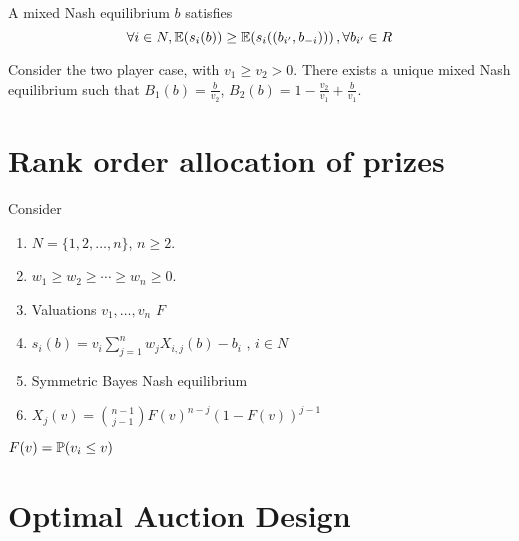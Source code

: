 A mixed Nash equilibrium $b$ satisfies
\begin{equation}
  \label{eq:3}
  \forall i \in N, \E{s_{i}(b)} \geq \E{s_{i}((b_{i'}, b_{-i}))}, \forall b_{i'} \in R
\end{equation}

Consider the two player case, with $v_{1} \geq v_{2} > 0$.  There
exists a unique mixed Nash equilibrium such that $B_{1}(b) =
\frac{b}{v_{2}}$, $B_{2}(b) = 1 - \frac{v_{2}}{v_{1}} +
\frac{b}{v_{1}}$.



\section{Rank order allocation of prizes}
\label{sec:rank-order-alloc}

Consider
\begin{enumerate}
\item $N = \{ 1,2, \dots, n \}$, $n \geq 2$.
\item $w_{1} \geq w_{2} \geq \cdots \geq w_{n} \geq 0$.
\item Valuations $v_{1}, \dots, v_{n}$ \iid $F$
\item $s_{i}(b) = v_{i} \sum_{j=1}^{n} w_{j} X_{i, j}(b) - b_{i}$  , $
  i \in N$
\item Symmetric Bayes Nash equilibrium
\item $X_{j}(v) = {n-1 \choose j - 1} F(v)^{n-j} (1-F(v))^{j-1}$
\end{enumerate}

$F(v) = \Prob{v_{i} \leq v}$

\section{Optimal Auction Design}
\label{sec:optim-auct-design}



